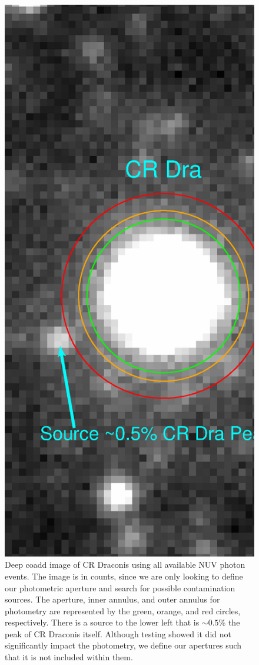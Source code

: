 \documentclass[preprint]{aastex}
\begin{document}
\clearpage

\begin{figure}
\includegraphics[scale=0.375]{Fig15.eps}
\caption{Deep coadd image of CR Draconis using all available NUV photon events. The image is in counts, since we are only looking to define our photometric aperture and search for possible contamination sources. The aperture, inner annulus, and outer annulus for photometry are represented by the green, orange, and red circles, respectively.  There is a source to the lower left that is $\sim 0.5$\% the peak of CR Draconis itself. Although testing showed it did not significantly impact the photometry, we define our apertures such that it is not included within them.\label{crdracoadd}}
\end{figure}
\end{document}
